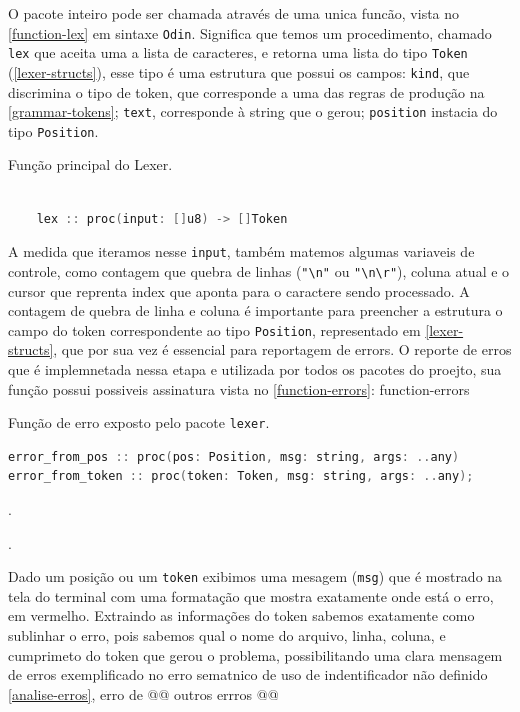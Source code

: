 O pacote inteiro pode ser chamada através de uma unica funcão, vista no \autoref{function-lex} em sintaxe \texttt{Odin}. Significa que temos um procedimento, chamado \texttt{lex} que aceita uma a lista de caracteres, e retorna uma lista do tipo \texttt{Token} (\autoref{lexer-structs}), esse tipo é uma estrutura que possui os campos: \texttt{kind}, que discrimina o tipo de token, que corresponde a uma das regras de produção na \autoref{grammar-tokens}; \texttt{text}, corresponde à string que o gerou; \texttt{position} instacia do tipo \texttt{Position}.

\begin{codigo}[htb]
        \caption{\small Função principal do Lexer. }
        \label{function-lex}
  \begin{lstlisting}[language = c]
  
    lex :: proc(input: []u8) -> []Token
  \end{lstlisting}
\end{codigo}

A medida que iteramos nesse \texttt{input}, também matemos algumas variaveis de controle, como contagem que quebra de linhas (\verb|"\n"| ou \verb|"\n\r"|), coluna atual e o cursor que reprenta index que aponta para o caractere sendo processado. A contagem de quebra de linha e coluna é importante para preencher a estrutura o campo do token correspondente ao tipo \texttt{Position}, representado em \autoref{lexer-structs}, que por sua vez é essencial para reportagem de errors. O reporte de erros que é implemnetada nessa etapa e utilizada por todos os pacotes do proejto, sua função possui possiveis assinatura vista no \autoref{function-errors}:
function-errors

\begin{codigo}[htb]
    \caption{\small Função de erro exposto pelo pacote \texttt{lexer}. }
        \label{function-errors}
\begin{lstlisting}[language=C++]
error_from_pos :: proc(pos: Position, msg: string, args: ..any)
error_from_token :: proc(token: Token, msg: string, args: ..any);
\end{lstlisting}.
\end{codigo}.

Dado um posição ou um \texttt{token} exibimos uma mesagem (\texttt{msg}) que é mostrado na tela do terminal com uma formatação que mostra exatamente onde está o erro, em vermelho. Extraindo as informações do token sabemos exatamente como sublinhar o erro, pois sabemos qual o nome do arquivo, linha, coluna, e cumprimeto do token que gerou o problema, possibilitando uma clara mensagem de erros exemplificado no erro sematnico de uso de indentificador não definido \autoref{analise-erros}, erro de @@ outros errros @@

